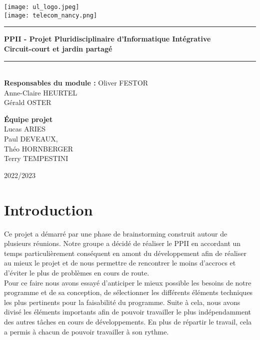 \documentclass[12pt,titlepage]{report}
\begin{document}
\begin{titlepage}
\newcommand{\HRule}{\rule{\linewidth}{0.5mm}}
\center
\texttt{[image: ul\_logo.jpeg]} \\[0.6cm]
\texttt{[image: telecom\_nancy.png]} \\[0.2cm]
\HRule
{ \huge \bfseries PPII - Projet Pluridisciplinaire d'Informatique Intégrative \\
        \Large Circuit-court et jardin partagé \\[0.15cm] }
\HRule \\[1cm]
{\LARGE \textbf{Responsables du module :}}
\vskip 0.1cm
{\Large 
Oliver FESTOR \\ 
Anne-Claire HEURTEL \\ 
Gérald OSTER \\
} 


\vspace{1cm}
{\LARGE \textbf{Équipe projet}} \\ 
\vspace{0.1cm}
\Large Lucas ARIES \\
Paul DEVEAUX, \\ 
Théo HORNBERGER \\
Terry TEMPESTINI\\
\vspace{3cm}
    
2022/2023 \\ [1cm]
\end{titlepage}

\tableofcontents
\clearpage
\chapter{Introduction}

Ce projet a démarré par une phase de brainstorming construit autour de plusieurs réunions. Notre groupe a décidé de réaliser le PPII en accordant un temps particulièrement conséquent en amont du développement afin de réaliser au mieux le projet et de nous permettre de rencontrer le moins d’accrocs et d’éviter le plus de problèmes en cours de route. \\ 

Pour ce faire nous avons essayé d’anticiper le mieux possible les besoins de notre programme et de sa conception, de sélectionner les différents éléments techniques les plus pertinents pour la faisabilité du programme. Suite à cela, nous avons divisé les éléments importants afin de pouvoir travailler le plus indépendamment des autres tâches en cours de développements. En plus de répartir le travail, cela a permis à chacun de pouvoir travailler à son rythme. \\ \\
\end{document}
